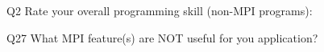 \begin{description}%
\item{Q2} Rate your overall programming skill (non-MPI programs):%
\item{Q27} What MPI feature(s) are NOT useful for you application?%
\end{description}%
